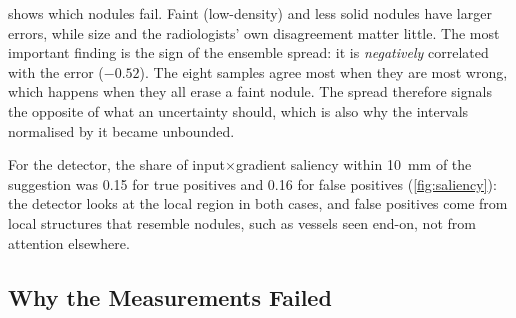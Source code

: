  shows which nodules fail. Faint (low-density) and less solid nodules have larger errors, while size and the radiologists' own disagreement matter little. The most important finding is the sign of the ensemble spread: it is \emph{negatively} correlated with the error ($-0.52$). The eight samples agree most when they are most wrong, which happens when they all erase a faint nodule. The spread therefore signals the opposite of what an uncertainty should, which is also why the intervals normalised by it became unbounded.

For the detector, the share of input$\times$gradient saliency within 10~mm of the suggestion was 0.15 for true positives and 0.16 for false positives (\cref{fig:saliency}): the detector looks at the local region in both cases, and false positives come from local structures that resemble nodules, such as vessels seen end-on, not from attention elsewhere.


\subsection{Why the Measurements Failed}

